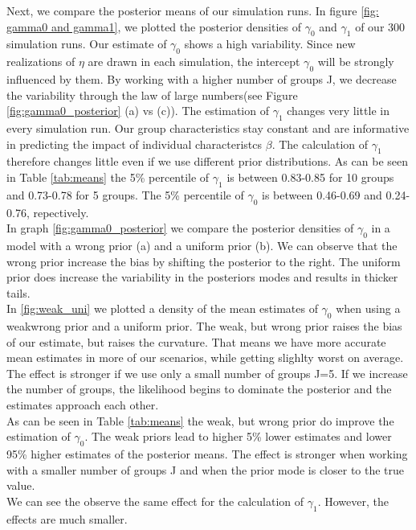 Next, we compare the posterior means of our simulation runs. In figure \ref{fig: gamma0 and gamma1}, we plotted the posterior densities of $\gamma_0$ and $\gamma_1$ of our 300 simulation runs. Our estimate of $\gamma_0$ shows a high variability. Since new realizations of $\eta$ are drawn in each simulation, the intercept $\gamma_0$ will be strongly influenced by them. By working with a higher number of groups J, we decrease the variability through the law of large numbers(see Figure \ref{fig:gamma0_posterior} (a) vs (c)).
The estimation of $\gamma_1$  changes very little in every simulation run. Our group characteristics stay constant and are informative in predicting the impact of individual characteristcs $\beta$. 
The calculation of $\gamma_1$ therefore changes little even if we use different prior distributions. As can be seen in Table \ref{tab:means} the 5\% percentile of $\gamma_1$ is between 0.83-0.85 for 10 groups and 0.73-0.78 for 5 groups.
The 5\% percentile of $\gamma_0$ is between 0.46-0.69 and 0.24-0.76, repectively.\\
In graph \ref{fig:gamma0_posterior} we compare the posterior densities of $\gamma_0$ in a model with a wrong prior (a) and a uniform prior (b). We can observe that the wrong prior increase the bias by shifting the posterior to the right. The uniform prior does increase the variability in the posteriors modes and results in thicker tails.\\
In \ref{fig:weak_uni} we plotted a density of the mean estimates of $\gamma_0$ when using a weakwrong prior and a uniform prior. The weak, but wrong prior raises the bias of our estimate, but raises the curvature. That means we have more accurate mean estimates in more of our scenarios, while getting slighlty worst on average. The effect is stronger if we use only a small number of groups J=5. If we increase the number of groups, the likelihood begins to dominate the posterior and the estimates approach each other. \\
As can be seen in Table \ref{tab:means} the weak, but wrong prior do improve the estimation of $\gamma_0$. The weak priors lead to higher 5\% lower estimates and lower 95\% higher estimates of the posterior means. The effect is stronger when working with a smaller number of groups J and when the prior mode is closer to the true value.\\
We can see the observe the same effect for the calculation of $\gamma_1$. However, the effects are much smaller.\\

